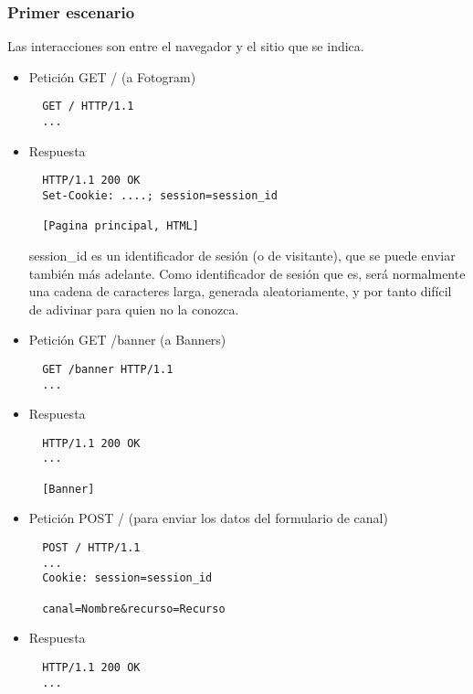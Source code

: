 \subsubsection*{Primer escenario}

Las interacciones son entre el navegador y el sitio que se indica.

\begin{itemize}
\item Petición GET / (a Fotogram)

\begin{verbatim}
  GET / HTTP/1.1
  ...
\end{verbatim}

\item Respuesta

\begin{verbatim}
  HTTP/1.1 200 OK
  Set-Cookie: ....; session=session_id

  [Pagina principal, HTML]
\end{verbatim}

session\_id es un identificador de sesión (o de visitante), que se puede enviar también más adelante. Como identificador de sesión que es, será normalmente una cadena de caracteres larga, generada aleatoriamente, y por tanto difícil de adivinar para quien no la conozca.

\item Petición GET /banner (a Banners)

\begin{verbatim}
  GET /banner HTTP/1.1
  ...
\end{verbatim}

\item Respuesta

\begin{verbatim}
  HTTP/1.1 200 OK
  ...

  [Banner]
\end{verbatim}

\item Petición POST / (para enviar los datos del formulario de canal)

\begin{verbatim}
  POST / HTTP/1.1
  ...
  Cookie: session=session_id

  canal=Nombre&recurso=Recurso
\end{verbatim}

\item Respuesta

\begin{verbatim}
  HTTP/1.1 200 OK
  ...


\end{verbatim}
\end{itemize}
